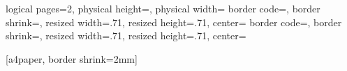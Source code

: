 {
  \usepackage{pgf}
  \usepackage{pgfpages}

{
  \edef\pgfpageoptionheight{\the\paperheight} 
  \edef\pgfpageoptionwidth{\the\paperwidth}
  \edef\pgfpageoptionborder{2pt}
}
{
  \pgfpagesphysicalpageoptions
  {%
    logical pages=2,%
    physical height=\pgfpageoptionheight,%
    physical width=\pgfpageoptionwidth%
  }
  {%
    border code=\pgfsetlinewidth{1pt}\pgfstroke,%
    border shrink=\pgfpageoptionborder,%
    resized width=.71\pgfphysicalwidth,%
    resized height=.71\pgfphysicalheight,%
    center=\pgfpoint{.5\pgfphysicalwidth}{.75\pgfphysicalheight}%
  }%
  {%
    border code=\pgfsetlinewidth{1pt}\pgfstroke,%
    border shrink=\pgfpageoptionborder,%
    resized width=.71\pgfphysicalwidth,%
    resized height=.71\pgfphysicalheight,%
    center=\pgfpoint{.5\pgfphysicalwidth}{.25\pgfphysicalheight}%
  }%
}


  [a4paper, border shrink=2mm]
  \nofiles
}
